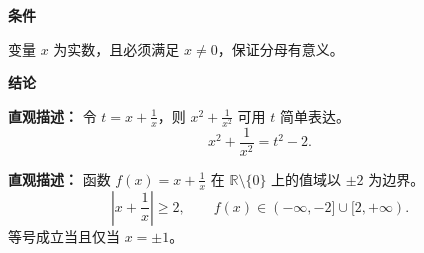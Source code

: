 \begin{statementbox}
	\textbf{\textcolor{CStatement}{条件}}
	\begin{description}[style=nextline, leftmargin=2.8em, labelsep=0.5em, itemsep=0.35em]
		\item[\textbf{\textcolor{CStatement}{条件1（实数非零）：}}]
		      变量 $x$ 为实数，且必须满足 $x\neq 0$，保证分母有意义。
	\end{description}
	\textbf{\textcolor{CStatement}{结论}}
	\begin{description}[style=nextline, leftmargin=2.8em, labelsep=0.5em, itemsep=0.45em]
		\item[\textbf{\textcolor{CStatement}{结论一（平方恒等式）：}}]
		      \textbf{\textcolor{CStatement}{直观描述：}}
		      \quad 令 $t=x+\frac{1}{x}$，则 $x^2+\frac{1}{x^2}$ 可用 $t$ 简单表达。
		      \[
			      x^2+\frac{1}{x^2} = t^2-2.
		      \]
		\item[\textbf{\textcolor{CStatement}{推广结论（值域范围）：}}]
		      \textbf{\textcolor{CStatement}{直观描述：}}
		      \quad 函数 $f(x)=x+\frac{1}{x}$ 在 $\mathbb{R}\setminus\{0\}$ 上的值域以 $\pm 2$ 为边界。
		      \[
			      \left|x+\frac{1}{x}\right|\ge 2,
			      \qquad
			      f(x)\in (-\infty,-2]\cup[2,+\infty).
		      \]
		      等号成立当且仅当 $x=\pm 1$。
	\end{description}

\end{statementbox}